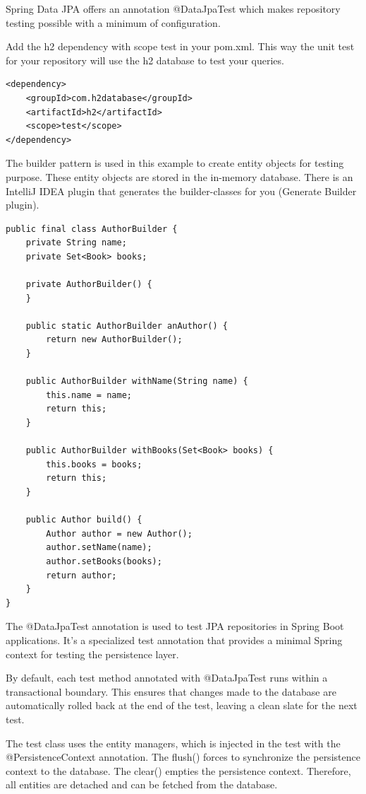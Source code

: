 Spring Data JPA offers an annotation @DataJpaTest which makes repository testing possible with a minimum of configuration. 

Add the h2 dependency with scope test in your pom.xml. This way the unit test for your repository will use the h2 database to test your queries.

\begin{lstlisting}
<dependency>
	<groupId>com.h2database</groupId>
	<artifactId>h2</artifactId>
	<scope>test</scope>
</dependency>
\end{lstlisting}

The builder pattern is used in this example to create entity objects for testing purpose. These entity objects are stored in the in-memory database. There is an IntelliJ IDEA plugin that generates the builder-classes for you (Generate Builder plugin).

\begin{lstlisting}
public final class AuthorBuilder {
    private String name;
    private Set<Book> books;

    private AuthorBuilder() {
    }

    public static AuthorBuilder anAuthor() {
        return new AuthorBuilder();
    }

    public AuthorBuilder withName(String name) {
        this.name = name;
        return this;
    }

    public AuthorBuilder withBooks(Set<Book> books) {
        this.books = books;
        return this;
    }

    public Author build() {
        Author author = new Author();
        author.setName(name);
        author.setBooks(books);
        return author;
    }
}
\end{lstlisting}

The @DataJpaTest annotation is used to test JPA repositories in Spring Boot applications. It’s a specialized test annotation that provides a minimal Spring context for testing the persistence layer. 

By default, each test method annotated with @DataJpaTest runs within a transactional boundary. This ensures that changes made to the database are automatically rolled back at the end of the test, leaving a clean slate for the next test.

The test class uses the entity managers, which is injected in the test with the @PersistenceContext annotation. The flush() forces to synchronize the persistence context to the database. The clear() empties the persistence context. Therefore, all entities are detached and can be fetched from the database.


